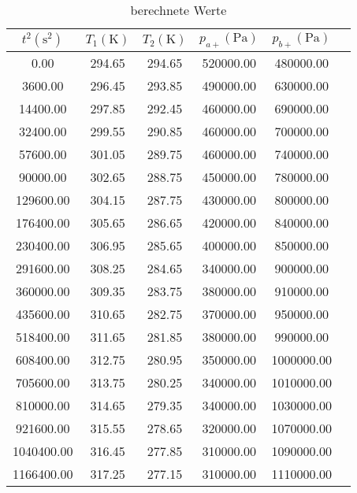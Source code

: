 \begin{table}
  \centering
  \caption{berechnete Werte}
  \label{tab:berechnete_werte}
  \begin{tabular}{c c c c c c}  %
    \toprule
    {$t^{2} (\unit{\second\squared})$}&
    {$T_{1} (\unit{\kelvin})$}&
    {$T_{2} (\unit{\kelvin})$}&
    {$p_{a+} (\unit{\pascal})$}&
    {$p_{b+} (\unit{\pascal})$}& \\
    \midrule
          0.00 &  294.65 &  294.65 & 520000.00 &  480000.00 \\
       3600.00 &  296.45 &  293.85 & 490000.00 &  630000.00 \\
      14400.00 &  297.85 &  292.45 & 460000.00 &  690000.00 \\
      32400.00 &  299.55 &  290.85 & 460000.00 &  700000.00 \\
      57600.00 &  301.05 &  289.75 & 460000.00 &  740000.00 \\
      90000.00 &  302.65 &  288.75 & 450000.00 &  780000.00 \\
     129600.00 &  304.15 &  287.75 & 430000.00 &  800000.00 \\
     176400.00 &  305.65 &  286.65 & 420000.00 &  840000.00 \\
     230400.00 &  306.95 &  285.65 & 400000.00 &  850000.00 \\
     291600.00 &  308.25 &  284.65 & 340000.00 &  900000.00 \\
     360000.00 &  309.35 &  283.75 & 380000.00 &  910000.00 \\
     435600.00 &  310.65 &  282.75 & 370000.00 &  950000.00 \\
     518400.00 &  311.65 &  281.85 & 380000.00 &  990000.00 \\
     608400.00 &  312.75 &  280.95 & 350000.00 & 1000000.00 \\
     705600.00 &  313.75 &  280.25 & 340000.00 & 1010000.00 \\
     810000.00 &  314.65 &  279.35 & 340000.00 & 1030000.00 \\
     921600.00 &  315.55 &  278.65 & 320000.00 & 1070000.00 \\
    1040400.00 &  316.45 &  277.85 & 310000.00 & 1090000.00 \\
    1166400.00 &  317.25 &  277.15 & 310000.00 & 1110000.00 \\

\end{tabular}
\end{table}
